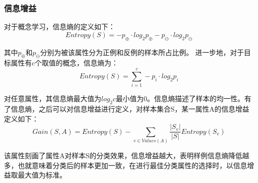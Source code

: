 \documentclass[a4papper]{article}
\begin{document}
\subsubsection{信息增益}
\par\setlength{\parindent}{2em} %
对于概念学习，信息熵的定义如下：
\begin{equation*}
Entropy(S) = -p_{\oplus} \cdot log_2 p_{\oplus} - p_{\ominus} \cdot log_2 p_{\ominus}
\end{equation*}
\par\setlength{\parindent}{2em} %
其中$p_{\oplus}$和$p_{\ominus}$分别为被该属性分为正例和反例的样本所占比例。
进一步地，对于目标属性有c个取值的概念，信息熵为：
\begin{equation*}
Entropy(S) = \sum_{i = 1}^{c} -p_{i} \cdot log_2 p_{i}
\end{equation*}
\par\setlength{\parindent}{2em} %
对任意属性，其信息熵最大值为$log_2 c$最小值为0。信息熵描述了样本的均一性。有了信息熵，之后可以对信息增益进行定义，对样本集合S，某一属性A的信息增益定义如下：
\begin{equation*}
Gain(S, A) = Entropy(S) - \sum_{v \in Values(A)}\frac{\left|S_v\right|}{\left|S\right|}Entropy(S_v)
\end{equation*}
\par\setlength{\parindent}{2em} %
该属性刻画了属性A对样本S的分类效果，信息增益越大，表明样例信息熵降低越多，也就意味着分类后的样本更加一致，在进行最佳分类属性的选择时，以信息增益取最大值为标准。
\end{document}
